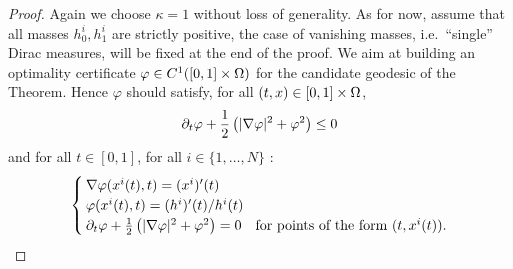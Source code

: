 \begin{proof}
Again we choose $\kappa=1$ without loss of generality. As for now, assume that all masses $h^i_0, h^i_1$ are strictly positive, the case of vanishing masses, i.e.\ ``single'' Dirac measures, will be fixed at the end of the proof. We aim at building an optimality certificate $\varphi \in C^1([0,1]\times \Omega)$ for the candidate geodesic of the Theorem. Hence $\varphi $ should satisfy, for all $(t,x)\in [0,1]\times \Omega$,
\[
\partial_t \varphi +\frac12 \left( |\nabla \varphi| ^2 +  \varphi^2 \right) \leq 0
\]
and for all $t\in [0,1]$, for all $i\in \{ 1, \dots , N \}$ :
\[
\quad 
\begin{cases}
\nabla \varphi(x^i(t),t) = (x^i)'(t) \\
\varphi(x^i(t),t)=(h^i)'(t)/h^i(t) \\
\partial_t \varphi +\frac12 \left( |\nabla \varphi |^2 + \varphi^2 \right) = 0 \quad  \text{for points of the form $(t,x^i(t))$}.
\end{cases}
\]


\end{proof}
